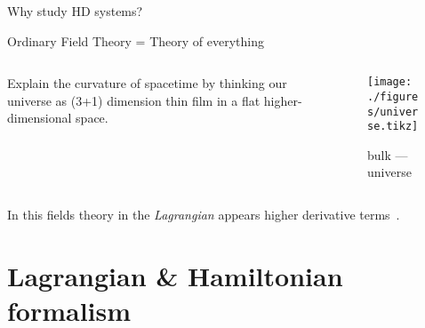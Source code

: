 \documentclass[10pt]{beamer}
\begin{document}
  \begin{frame}{Why study HD systems?}
    \begin{alertblock}{Ordinary Field Theory = Theory of everything}
    \begin{columns}
      \begin{column}{0.45\textwidth}
        Explain the curvature of spacetime by thinking our universe as (3+1)
        dimension thin film in a flat higher-dimensional space.
      \end{column}
      \begin{column}{0.45\textwidth}
        \begin{figure}
          \texttt{[image: ./figures/universe.tikz]}
          \caption[labelformat=empty]{bulk ---
          \alert{universe}}\label{fig:Universe}
        \end{figure}
      \end{column}
    \end{columns}
    \end{alertblock}
    In this fields theory in the \emph{Lagrangian} appears \alert{higher
    derivative terms}~\cite{Smilga17}.
  \end{frame}

  \section{Lagrangian \& Hamiltonian formalism}
\end{document}
